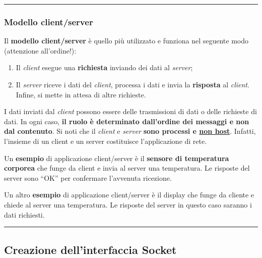 \documentclass[a4paper]{article}
\newcommand{\longline}{\noindent\rule{\textwidth}{0.4pt}}
\newcommand{\dquotes}[1]{``#1''}
\begin{document}
	\longline
	
	\subsubsection{Modello client/server}
	
	Il \textcolor{Red3}{\textbf{modello client/server}} è quello più utilizzato e funziona nel seguente modo (attenzione all'ordine!):
	\begin{enumerate}
		\item Il \emph{client} esegue una \textbf{richiesta} inviando dei dati al \emph{server};
		
		\item Il \emph{server} riceve i dati del \emph{client}, processa i dati e invia la \textbf{risposta} al \emph{client}. Infine, si mette in attesa di altre richieste.
	\end{enumerate}
	I dati inviati dal \emph{client} possono essere delle trasmissioni di dati o delle richieste di dati. In ogni caso, \textbf{il ruolo è determinato dall'ordine dei messaggi e non dal contenuto}. Si noti che il \emph{client} e \emph{server} \textbf{sono processi e \underline{non host}}. Infatti, l'insieme di un client e un server costituisce l'applicazione di rete.\newline
	
	\noindent
	Un \textcolor{Green4}{\textbf{esempio}} di applicazione client/server è il \textbf{sensore di temperatura corporea} che funge da client e invia al server una temperatura. Le risposte del server sono \dquotes{OK} per confermare l'avvenuta ricezione.\newline
	
	\noindent
	Un altro \textcolor{Green4}{\textbf{esempio}} di applicazione client/server è il display che funge da cliente e chiede al server una temperatura. Le risposte del server in questo caso saranno i dati richiesti.
	
	\longline
	
	\subsection{Creazione dell'interfaccia Socket}
	
\end{document}
